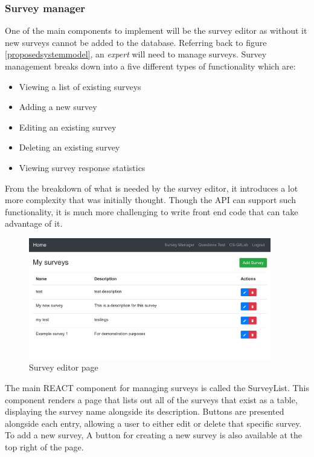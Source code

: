 \subsubsection{Survey manager}
One of the main components to implement will be the survey editor as without it new surveys cannot be added to the database.
Referring back to figure \ref{proposedsystemmodel}, an \textit{expert} will need to manage surveys.
Survey management breaks down into a five different types of functionality which are:

\begin{itemize}
    \tightlist
    \item Viewing a list of existing surveys 
    \item Adding a new survey
    \item Editing an existing survey
    \item Deleting an existing survey
    \item Viewing survey response statistics
\end{itemize}

From the breakdown of what is needed by the survey editor, it introduces a lot more complexity that was initially thought.
Though the API can support such functionality, it is much more challenging to write front end code that can take advantage of it.


\begin{figure}[ht]
    \centering
    \includegraphics[width=400px]{images/survey_manager_screen.png}
    \caption{Survey editor page}
    \label{surveyeditorpage}
\end{figure}

The main REACT component for managing surveys is called the SurveyList.
This component renders a page that lists out all of the surveys that exist as a table, displaying the survey name alongside its 
description.
Buttons are presented alongside each entry, allowing a user to either edit or delete that specific survey.
To add a new survey, 
A button for creating a new survey is also available at the top right of the page.

